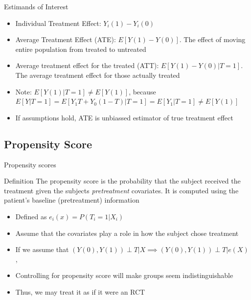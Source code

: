 \begin{frame}{Estimands of Interest}
 \begin{itemize}
 \item Individual Treatment Effect: $Y_i(1)-Y_i(0)$
 \item Average Treatment Effect (ATE): $E[Y(1)-Y(0)]$. The effect of moving entire population
 from treated to untreated
 \item Average treatment effect for the treated (ATT): $E[Y(1)-Y(0)|T=1]$. The average treatment
 effect for those actually treated
 \item Note:  $E[Y(1)|T=1]\neq E[Y(1)]$, because $E[Y|T=1]=E[Y_1T+Y_0(1-T)|T=1]=E[Y_1|T=1]\neq E[Y(1)]$
\item If assumptions hold, ATE is unbiassed estimator of true treatment effect
 \end{itemize}
 
\end{frame}

\subsection{Propensity Score}
\begin{frame}{Propensity scores}
\begin{block}{Definition}
The propensity score is the probability that the subject received the treatment given the subjects \textit{pretreatment}
covariates. It is computed using the patient's baseline (pretreatment) information \cite{Rosenbaum1983}
\end{block}
 \begin{itemize}
  \item Defined as  $e_i(x)=P(T_i =1 |X_i)$
  \item Assume that the covariates play a role in how the subject chose treatment
  \item If we assume that $(Y(0),Y(1))\perp T|X \implies (Y(0),Y(1))\perp T|e(X)$, \cite{Rosenbaum1983}
  \item Controlling for propensity score will make groups seem indistinguishable
  \item Thus, we may treat it as if it were an RCT
 \end{itemize}

\end{frame}

